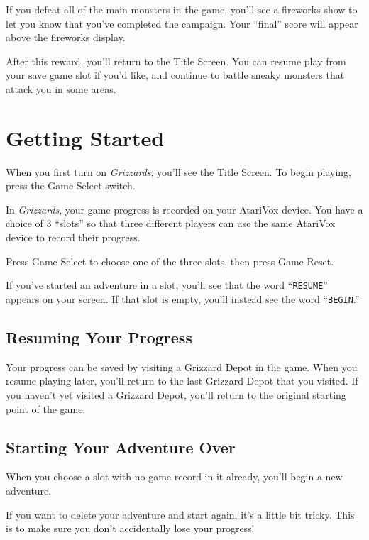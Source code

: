 \documentclass[12pt,twoside,openright,book]{memoir}
\begin{document}
\else

If  you  defeat  all of  the  main  monsters  in  the game,  you'll  see
a fireworks  show to let  you know  that you've completed  the campaign.
Your ``final'' score will appear above the fireworks display.

After this  reward, you'll return  to the  Title Screen. You  can resume
play from  your save  game slot  if you'd like,  and continue  to battle
sneaky monsters that attack you in some areas.

\fi

\chapter{Getting Started}\label{Getting Started}

When you first turn on \textit{Grizzards}, you'll see the Title Screen.
To begin playing, press the Game Select switch.

In \textit{Grizzards}, your game  progress is recorded on your AtariVox
device. You have a choice of 3 ``slots'' so that three different players
can use the same AtariVox device to record their progress.

Press  Game  Select  to  choose  one of  the  three  slots,  then  press
Game Reset.

If  you've started  an adventure  in a  slot, you'll  see that  the word
``\texttt{RESUME}'' appears on your screen. If that slot is empty, you'll instead
see the word ``\texttt{BEGIN}.''

\section{Resuming Your Progress}

Your progress  can be saved  by visiting a  Grizzard Depot in  the game.
When you resume playing later, you'll  return to the last Grizzard Depot
that you  visited. If you haven't  yet visited a Grizzard  Depot, you'll
return to the original starting point of the game.

\section{Starting Your Adventure Over}\label{Starting Your Adventure Over}

When you choose a  slot with no game record in  it already, you'll begin
a new adventure.

If you want to delete your adventure  and start again, it's a little bit
tricky. This is to make sure you don't accidentally lose your progress!
\end{document}
